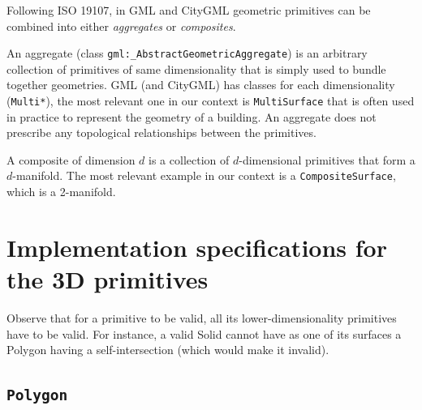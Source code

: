 %

Following ISO 19107, in GML and CityGML geometric primitives can be combined into either \emph{aggregates} or \emph{composites}.

An aggregate (class \texttt{gml:\_AbstractGeometricAggregate}) is an arbitrary collection of primitives of same dimensionality that is simply used to bundle together geometries.
GML (and CityGML) has classes for each dimensionality (\texttt{Multi*}), the most relevant one in our context is \texttt{MultiSurface} that is often used in practice to represent the geometry of a building.
An aggregate does not prescribe any topological relationships between the primitives.

A composite of dimension $d$ is a collection of $d$-dimensional primitives that form a $d$-manifold. 
The most relevant example in our context is a \texttt{CompositeSurface}, which is a 2-manifold.



%
\section[Implementation specifications]{Implementation specifications for the 3D primitives}


Observe that for a primitive to be valid, all its lower-dimensionality primitives have to be valid.
For instance, a valid Solid cannot have as one of its surfaces a Polygon having a self-intersection (which would make it invalid).


\subsection{\texttt{Polygon}}

